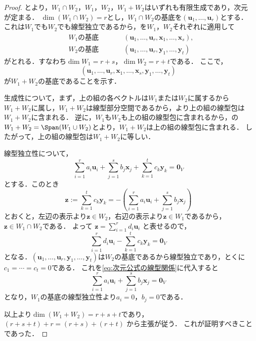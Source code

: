\begin{tleftbar}
\begin{proof}
  とより，$W_1 \cap W_2$，$W_1$，$W_2$，$W_1+W_2$はいずれも有限生成であり，次元が定まる．
  $\dim(W_1 \cap W_2) = r$とし，$W_1 \cap W_2$の基底を$(\bm{u}_1, \dots, \bm{u}_r)$とする．
  これは$W_1$でも$W_2$でも線型独立であるから，を$W_1$，$W_2$それぞれに適用して
  \[
    \begin{aligned}
      &\text{$W_1$の基底} \qquad
      &&(\bm{u}_1, \dots, \bm{u}_r, \bm{x}_1, \dots, \bm{x}_s),\\
      &\text{$W_2$の基底}
      &&(\bm{u}_1, \dots, \bm{u}_r, \bm{y}_1, \dots, \bm{y}_t)
    \end{aligned}
  \]
  がとれる．すなわち$\dim W_1 = r + s$，$\dim W_2 = r + t$である．
  ここで，
  \[
    (\bm{u}_1, \dots, \bm{u}_r, \bm{x}_1, \dots, \bm{x}_s, \bm{y}_1, \dots, \bm{y}_t)
  \]
  が$W_1 + W_2$の基底であることを示す．

  生成性について，まず，上の組の各ベクトルは$W_1$または$W_2$に属するから$W_1 + W_2$に属し，$W_1 + W_2$は線型部分空間であるから，より上の組の線型包は$W_1 + W_2$に含まれる．
  逆に，$W_1$も$W_2$も上の組の線型包に含まれるから，の$W_1 + W_2 = \Span(W_1 \cup W_2)$とより，$W_1 + W_2$は上の組の線型包に含まれる．
  したがって，上の組の線型包は$W_1 + W_2$に等しい．

  線型独立性について，
  \begin{equation}
    \sum_{i=1}^{r} a_i \bm{u}_i + \sum_{j=1}^{s} b_j \bm{x}_j + \sum_{k=1}^{t} c_k \bm{y}_k = \bm{0}_V
    \label{eq:次元公式の線型関係}
  \end{equation}
  とする．このとき
  \[
    \bm{z} := \sum_{k=1}^{t} c_k \bm{y}_k
    = -\left( \sum_{i=1}^{r} a_i \bm{u}_i + \sum_{j=1}^{s} b_j \bm{x}_j \right)
  \]
  とおくと，左辺の表示より$\bm{z} \in W_2$，右辺の表示より$\bm{z} \in W_1$であるから，$\bm{z} \in W_1 \cap W_2$である．
  よって
  $\bm{z} = \sum_{i=1}^{r} d_i \bm{u}_i$
  と表せるので，
  \[
    \sum_{i=1}^{r} d_i \bm{u}_i - \sum_{k=1}^{t} c_k \bm{y}_k = \bm{0}_V
  \]
  となる．$(\bm{u}_1, \dots, \bm{u}_r, \bm{y}_1, \dots, \bm{y}_t)$は$W_2$の基底であるから線型独立であり，とくに$c_1 = \cdots = c_t = 0$である．
  これを\eqref{eq:次元公式の線型関係}に代入すると
  \[
    \sum_{i=1}^{r} a_i \bm{u}_i + \sum_{j=1}^{s} b_j \bm{x}_j = \bm{0}_V
  \]
  となり，$W_1$の基底の線型独立性より$a_i = 0$，$b_j = 0$である．

  以上より$\dim(W_1 + W_2) = r + s + t$であり，
  $(r + s + t) + r = (r + s) + (r + t)$
  から主張が従う．
  これが証明すべきことであった．
\end{proof}
\end{tleftbar}

